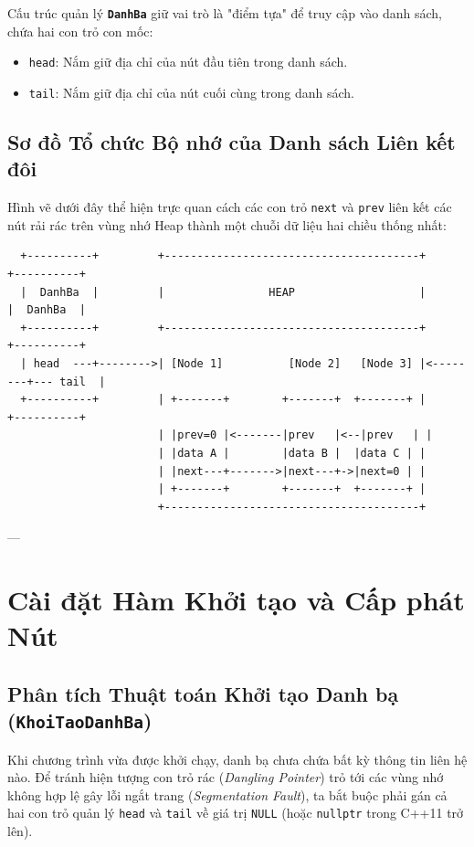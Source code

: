 \documentclass[12pt,a4paper]{report}
\begin{document}
Cấu trúc quản lý \textbf{\texttt{DanhBa}} giữ vai trò là "điểm tựa" để truy cập vào danh sách, chứa hai con trỏ con mốc:
\begin{itemize}
    \item \texttt{head}: Nắm giữ địa chỉ của nút đầu tiên trong danh sách.
    \item \texttt{tail}: Nắm giữ địa chỉ của nút cuối cùng trong danh sách.
\end{itemize}

\subsection{Sơ đồ Tổ chức Bộ nhớ của Danh sách Liên kết đôi}
Hình vẽ dưới đây thể hiện trực quan cách các con trỏ \texttt{next} và \texttt{prev} liên kết các nút rải rác trên vùng nhớ Heap thành một chuỗi dữ liệu hai chiều thống nhất:

\begin{center}
\begin{verbatim}
  +----------+         +---------------------------------------+         +----------+
  |  DanhBa  |         |                HEAP                   |         |  DanhBa  |
  +----------+         +---------------------------------------+         +----------+
  | head  ---+-------->| [Node 1]          [Node 2]   [Node 3] |<--------+--- tail  |
  +----------+         | +-------+        +-------+  +-------+ |         +----------+
                       | |prev=0 |<-------|prev   |<--|prev   | |
                       | |data A |        |data B |  |data C | |
                       | |next---+------->|next---+->|next=0 | |
                       | +-------+        +-------+  +-------+ |
                       +---------------------------------------+
\end{verbatim}
\end{center}

---

\section{Cài đặt Hàm Khởi tạo và Cấp phát Nút}

\subsection{Phân tích Thuật toán Khởi tạo Danh bạ (\texttt{KhoiTaoDanhBa})}
Khi chương trình vừa được khởi chạy, danh bạ chưa chứa bất kỳ thông tin liên hệ nào. Để tránh hiện tượng con trỏ rác (\textit{Dangling Pointer}) trỏ tới các vùng nhớ không hợp lệ gây lỗi ngắt trang (\textit{Segmentation Fault}), ta bắt buộc phải gán cả hai con trỏ quản lý \texttt{head} và \texttt{tail} về giá trị \texttt{NULL} (hoặc \texttt{nullptr} trong C++11 trở lên).
\end{document}
